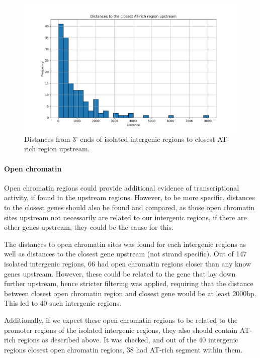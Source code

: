 \begin{figure}
  \centering
  \includegraphics[width=\linewidth]{images/histogramATrich.png}
  \caption{Distances from 3' ends of isolated intergenic regions to closest AT-rich region upstream.}
  \label{fig:distancesATrich}
\end{figure}

\paragraph{Open chromatin}

Open chromatin regions could provide additional evidence of transcriptional activity, if found in the upstream regions.
However, to be more specific, distances to the closest genes should also be found and compared, 
as those open chromatin sites upstream not necessarily are related to our intergenic regions, if there are other genes upstream,
they could be the cause for this.

The distances to open chromatin sites was found for each intergenic regions as well as distances to the closest gene upstream (not strand specific).
Out of 147 isolated intergenic regions, 66 had open chromatin regions closer than any know genes upstream.
However, these could be related to the gene that lay down further upstream,
hence stricter filtering was applied, requiring that the distance between closest open chromatin region and closest gene would be at least 2000bp.
This led to 40 such intergenic regions.

Additionally, if we expect these open chromatin regions to be related to the promoter regions of the isolated intergenic regions,
they also should contain AT-rich regions as described above.
It was checked, and out of the 40 intergenic regions closest open chromatin regions, 38 had AT-rich segment within them.

